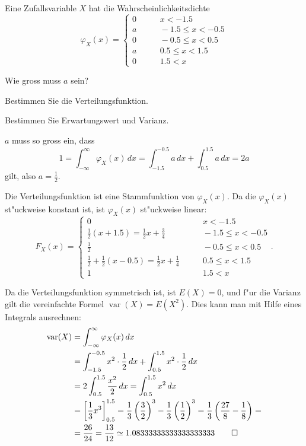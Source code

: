 Eine Zufallsvariable $X$ hat die Wahrscheinlichkeitsdichte
\[
\varphi_X(x)=\begin{cases}
0&\qquad x <-1.5\\
a&\qquad -1.5\le x<-0.5\\
0&\qquad -0.5\le x<0.5\\
a&\qquad 0.5\le x<1.5\\
0&\qquad 1.5<x
\end{cases}
\]
\begin{teilaufgaben}
\item Wie gross muss $a$ sein?
\item Bestimmen Sie die Verteilungsfunktion.
\item Bestimmen Sie Erwartungswert und Varianz.
\end{teilaufgaben}

\begin{loesung}
\begin{teilaufgaben}
\item $a$ muss so gross ein, dass
\[
1=\int_{-\infty}^\infty \varphi_X(x)\,dx=
\int_{-1.5}^{-0.5}a\,dx+\int_{0.5}^{1.5}a\,dx=2a
\]
gilt, also $a=\frac12$.
\item Die Verteilungsfunktion ist eine Stammfunktion von $\varphi_X(x)$.
Da die $\varphi_X(x)$ st"uckweise konstant ist, ist $\varphi_X(x)$
st"uckweise linear:
\[
F_X(x)=\begin{cases}
0&\qquad x <-1.5\\
\frac12(x+1.5)=\frac12x+\frac34&\qquad -1.5\le x<-0.5\\
\frac12&\qquad -0.5\le x<0.5\\
\frac12+\frac12(x-0.5)=\frac12x+\frac14&\qquad 0.5\le x<1.5\\
1&\qquad 1.5<x
\end{cases}.
\]
\item Da die Verteilungsfunktion symmetrisch ist, ist $E(X)=0$, und
f"ur die Varianz gilt die vereinfachte Formel $\operatorname{var}(X)=E(X^2)$.
Dies kann man mit Hilfe eines Integrals ausrechnen:
\begin{align*}
\operatorname{var}(X)
&=\int_{-\infty}^\infty \varphi_X(x)\,dx\\
&=\int_{-1.5}^{-0.5}x^2\cdot\frac12\,dx+\int_{0.5}^{1.5} x^2\cdot \frac12\,dx\\
&=2\int_{0.5}^{1.5}\frac{x^2}2\,dx=\int_{0.5}^{1.5}x^2\,dx\\
&=\left[\frac13x^3\right]_{0.5}^{1.5}
 =\frac13\left(\frac32\right)^3-\frac13\left(\frac12\right)^3
=\frac13\left(\frac{27}8-\frac18\right)=
\\
&=\frac{26}{24}=\frac{13}{12}
\simeq 1.08333333333333333333
\qedhere
\end{align*}
\end{teilaufgaben}
\end{loesung}


